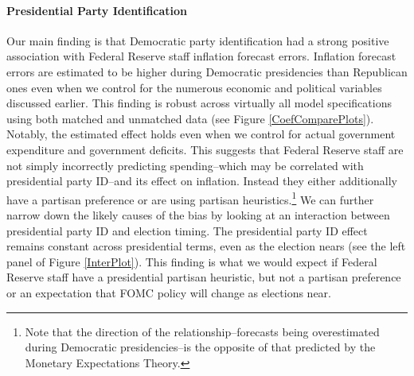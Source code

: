 \documentclass[a4paper]{article}\usepackage{graphicx, color}
\begin{document}
\paragraph{Presidential Party Identification}

Our main finding is that Democratic party identification had a strong positive association with Federal Reserve staff inflation forecast errors. Inflation forecast errors are estimated to be higher during Democratic presidencies than Republican ones even when we control for the numerous economic and political variables discussed earlier. This finding is robust across virtually all model specifications using both matched and unmatched data (see Figure \ref{CoefComparePlots}). Notably, the estimated effect holds even when we control for actual government expenditure and government deficits. This suggests that Federal Reserve staff are not simply incorrectly predicting spending--which may be correlated with presidential party ID--and its effect on inflation. Instead they either additionally have a partisan preference or are using partisan heuristics.\footnote{Note that the direction of the relationship--forecasts being overestimated during Democratic presidencies--is the opposite of that predicted by the Monetary Expectations Theory.} We can further narrow down the likely causes of the bias by looking at an interaction between presidential party ID and election timing. The presidential party ID effect remains constant across presidential terms, even as the election nears (see the left panel of Figure \ref{InterPlot}). This finding is what we would expect if Federal Reserve staff have a presidential partisan heuristic, but not a partisan preference or an expectation that FOMC policy will change as elections near.
\end{document}
